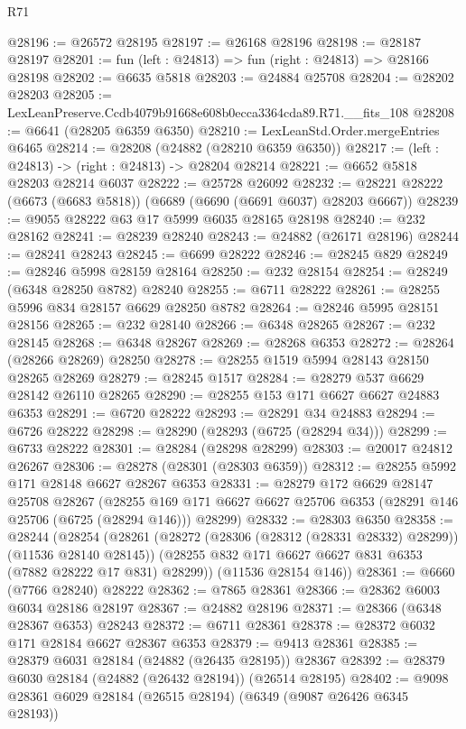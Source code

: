 \begin{lexlean}{R71}
\begin{coremodule}
@28196 := @26572 @28195
@28197 := @26168 @28196
@28198 := @28187 @28197
@28201 := fun (left : @24813) => fun (right : @24813) => @28166 @28198
@28202 := @6635 @5818
@28203 := @24884 @25708
@28204 := @28202 @28203
@28205 := LexLeanPreserve.Ccdb4079b91668e608b0ecca3364cda89.R71.__fits_108
@28208 := @6641 (@28205 @6359 @6350)
@28210 := LexLeanStd.Order.mergeEntries @6465
@28214 := @28208 (@24882 (@28210 @6359 @6350))
@28217 := (left : @24813) -> (right : @24813) -> @28204 @28214
@28221 := @6652 @5818 @28203 @28214 @6037
@28222 := @25728 @26092
@28232 := @28221 @28222 (@6673 (@6683 @5818)) (@6689 (@6690 (@6691 @6037) @28203 @6667))
@28239 := @9055 @28222 @63 @17 @5999 @6035 @28165 @28198
@28240 := @232 @28162
@28241 := @28239 @28240
@28243 := @24882 (@26171 @28196)
@28244 := @28241 @28243
@28245 := @6699 @28222
@28246 := @28245 @829
@28249 := @28246 @5998 @28159 @28164
@28250 := @232 @28154
@28254 := @28249 (@6348 @28250 @8782) @28240
@28255 := @6711 @28222
@28261 := @28255 @5996 @834 @28157 @6629 @28250 @8782
@28264 := @28246 @5995 @28151 @28156
@28265 := @232 @28140
@28266 := @6348 @28265
@28267 := @232 @28145
@28268 := @6348 @28267
@28269 := @28268 @6353
@28272 := @28264 (@28266 @28269) @28250
@28278 := @28255 @1519 @5994 @28143 @28150 @28265 @28269
@28279 := @28245 @1517
@28284 := @28279 @537 @6629 @28142 @26110 @28265
@28290 := @28255 @153 @171 @6627 @6627 @24883 @6353
@28291 := @6720 @28222
@28293 := @28291 @34 @24883
@28294 := @6726 @28222
@28298 := @28290 (@28293 (@6725 (@28294 @34)))
@28299 := @6733 @28222
@28301 := @28284 (@28298 @28299)
@28303 := @20017 @24812 @26267
@28306 := @28278 (@28301 (@28303 @6359))
@28312 := @28255 @5992 @171 @28148 @6627 @28267 @6353
@28331 := @28279
    @172
    @6629
    @28147
    @25708
    @28267
    (@28255 @169 @171 @6627 @6627 @25706 @6353 (@28291 @146 @25706 (@6725 (@28294 @146))) @28299)
@28332 := @28303 @6350
@28358 := @28244
    (@28254
      (@28261
        (@28272 (@28306 (@28312 (@28331 @28332) @28299)) (@11536 @28140 @28145))
        (@28255 @832 @171 @6627 @6627 @831 @6353 (@7882 @28222 @17 @831) @28299))
      (@11536 @28154 @146))
@28361 := @6660 (@7766 @28240) @28222
@28362 := @7865 @28361
@28366 := @28362 @6003 @6034 @28186 @28197
@28367 := @24882 @28196
@28371 := @28366 (@6348 @28367 @6353) @28243
@28372 := @6711 @28361
@28378 := @28372 @6032 @171 @28184 @6627 @28367 @6353
@28379 := @9413 @28361
@28385 := @28379 @6031 @28184 (@24882 (@26435 @28195)) @28367
@28392 := @28379 @6030 @28184 (@24882 (@26432 @28194)) (@26514 @28195)
@28402 := @9098 @28361 @6029 @28184 (@26515 @28194) (@6349 (@9087 @26426 @6345 @28193))

\end{coremodule}
\end{lexlean}
